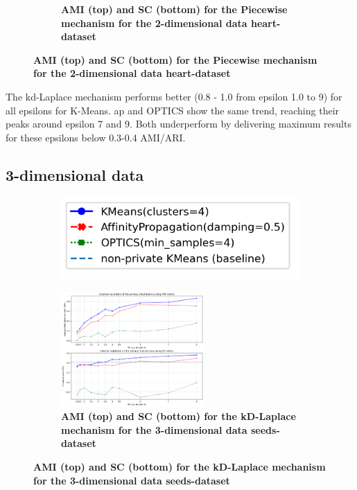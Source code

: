 \begin{figure}[H]
\begin{subfigure}{1\textwidth}
        \caption{\textbf{AMI (top) and SC (bottom) for the Piecewise mechanism for the 2-dimensional data heart-dataset}}
    \end{subfigure}
    \label{fig:validation-heart-dataset_comparison_2d-laplace}
\end{figure}
The kd-Laplace mechanism performs better (0.8 - 1.0 from epsilon 1.0 to 9) for all epsilons for K-Means.
\gls{ap} and OPTICS show the same trend, reaching their peaks around epsilon 7 and 9.
Both underperform by delivering maximum results for these epsilons below 0.3-0.4 AMI/ARI.\newline
\subsection{3-dimensional data}
\begin{figure}[H]
    \centering
    \begin{subfigure}{0.30\textwidth}
        \includegraphics[width=\textwidth]{Results/2d-laplace/seeds-dataset/legend.png}
    \end{subfigure}
    \begin{subfigure}{1\textwidth}
        \centering
        \includegraphics[width=0.60\textwidth]{Results/kd-laplace/kd-Laplace/seeds-dataset/ami-and-sc_3_dimensions.png}
        \centering
        \caption{\textbf{AMI (top) and SC (bottom) for the kD-Laplace mechanism for the 3-dimensional data seeds-dataset}}
    \end{subfigure}

\end{figure}
